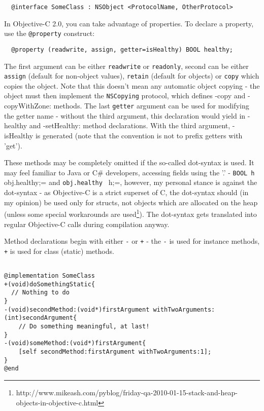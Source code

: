 \documentclass[a4paper, 11pt, fleqn]{book}
\begin{document}
\begin{verbatim}
  @interface SomeClass : NSObject <ProtocolName, OtherProtocol>
\end{verbatim}

In Objective-C 2.0, you can take advantage of properties. To declare a property, use the \verb=@property= construct:

\begin{verbatim}
  @property (readwrite, assign, getter=isHealthy) BOOL healthy;
\end{verbatim}

The first argument can be either \verb=readwrite= or \verb=readonly=, second can be either \verb=assign= (default for non-object values), \verb=retain= (default for objects) or \verb=copy= which copies the object. Note that this doesn't mean any automatic object copying - the object must then implement the \verb=NSCopying= protocol, which defines -copy and -copyWithZone: methods. The last \verb=getter= argument can be used for modifying the getter name - without the third argument, this declaration would yield in -healthy and -setHealthy: method declarations. With the third argument, -isHealthy is generated (note that the convention is not to prefix getters with 'get'). 

These methods may be completely omitted if the so-called dot-syntax is used. It may feel familiar to Java or C# developers, accessing fields using the '.' - \verb=BOOL h = obj.healthy;= and \verb=obj.healthy = h;=, however, my personal stance is against the dot-syntax - as Objective-C is a strict superset of C, the dot-syntax should (in my opinion) be used only for structs, not objects which are allocated on the heap (unless some special workarounds are used\footnote{http://www.mikeash.com/pyblog/friday-qa-2010-01-15-stack-and-heap-objects-in-objective-c.html}). The dot-syntax gets translated into regular Objective-C calls during compilation anyway.

Method declarations begin with either \verb=-= or \verb=+= - the \verb=-= is used for instance methods, \verb=+= is used for class (static) methods.


\begin{verbatim}

@implementation SomeClass
+(void)doSomethingStatic{
  // Nothing to do
}
-(void)secondMethod:(void*)firstArgument withTwoArguments:(int)secondArgument{
    // Do something meaningful, at last!
}
-(void)someMethod:(void*)firstArgument{
    [self secondMethod:firstArgument withTwoArguments:1];
}
@end

\end{verbatim}
\end{document}
